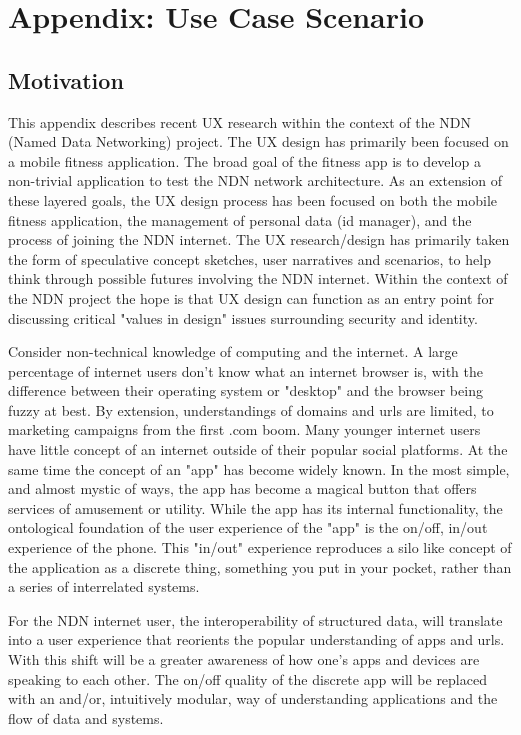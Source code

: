 \section{Appendix: Use Case Scenario}

\subsection{Motivation}
This appendix describes recent UX research within the context of the NDN (Named Data Networking) project. The UX design has primarily been focused on a mobile fitness application. The broad goal of the fitness app is to develop a non-trivial application to test the NDN network architecture. As an extension of these layered goals, the UX design process has been focused on both the mobile fitness application, the management of personal data (id manager), and the process of joining the NDN internet. The UX research/design has primarily taken the form of speculative concept sketches, user narratives and scenarios, to help think through possible futures involving the NDN internet. Within the context of the NDN project the hope is that UX design can function as an entry point for discussing critical "values in design" issues surrounding security and identity. 

Consider non-technical knowledge of computing and the internet. A large percentage of internet users don't know what an internet browser is, with the difference between their operating system or "desktop" and the browser being fuzzy at best. By extension, understandings of domains and urls are limited, to marketing campaigns from the first .com boom. Many younger internet users have little concept of an internet outside of their popular social platforms. At the same time the concept of an "app" has become widely known. In the most simple, and almost mystic of ways, the app has become a magical button that offers services of amusement or utility. While the app has its internal functionality, the ontological foundation of the user experience of the "app" is the on/off, in/out experience of the phone. This "in/out" experience reproduces a silo like concept of the application as a discrete thing, something you put in your pocket, rather than a series of interrelated systems. 

For the NDN internet user, the interoperability of structured data, will translate into a user experience that reorients the popular understanding of apps and urls. With this shift will be a greater awareness of how one's apps and devices are speaking to each other. The on/off quality of the discrete app will be replaced with an and/or, intuitively modular, way of understanding applications and the flow of data and systems.
  
